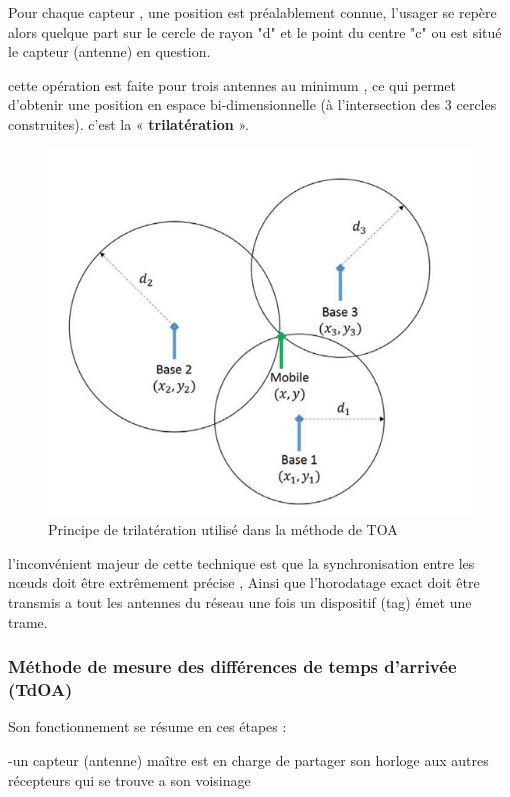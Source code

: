 \documentclass[12pt,a4paper]{report}
\begin{document}
\begin{itemize}
 Pour chaque capteur , une position est préalablement connue, l’usager se repère alors quelque part sur le cercle de rayon "d" et le point du centre "c" ou est situé le capteur (antenne) en question.
 
 cette opération est faite pour trois antennes au minimum , ce qui permet d’obtenir une position en espace bi-dimensionnelle (à l’intersection des 3 cercles construites). c'est la  « \textbf{trilatération} ».

\begin{figure}[H]
	\centering
	\includegraphics[width=1.1\linewidth]{Pics/trilateration.PNG}
	\caption{Principe de trilatération utilisé dans la méthode de TOA}
	\label{fig:trilateration}
	

\end{figure}

l'inconvénient majeur de cette technique est que la synchronisation entre les nœuds doit être extrêmement précise , Ainsi que l'horodatage exact doit être transmis a tout les antennes du réseau une fois un dispositif (tag) émet une trame.
\subsubsection{Méthode de mesure des différences de temps d’arrivée (TdOA)}

Son fonctionnement se résume en ces étapes : 

-un capteur (antenne) maître est en charge de partager son horloge aux autres récepteurs qui se trouve a son voisinage


\end{itemize}
\end{document}

